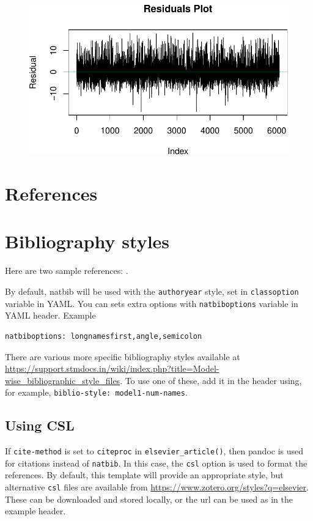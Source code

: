 \documentclass[
  super,
  preprint,
  3p]{elsarticle}
\begin{document}
\begin{figure}[H]

{\centering \includegraphics{project_report_files/figure-pdf/unnamed-chunk-17-1.pdf}

}

\end{figure}

\hypertarget{references}{%
\section*{References}\label{references}}

\hypertarget{bibliography-styles}{%
\section{Bibliography styles}\label{bibliography-styles}}

Here are two sample references: \citet{Feynman1963118}
\citet{Dirac1953888}.

By default, natbib will be used with the \texttt{authoryear} style, set
in \texttt{classoption} variable in YAML. You can sets extra options
with \texttt{natbiboptions} variable in YAML header. Example

\begin{verbatim}
natbiboptions: longnamesfirst,angle,semicolon
\end{verbatim}

There are various more specific bibliography styles available at
\url{https://support.stmdocs.in/wiki/index.php?title=Model-wise_bibliographic_style_files}.
To use one of these, add it in the header using, for example,
\texttt{biblio-style:\ model1-num-names}.

\hypertarget{using-csl}{%
\subsection{Using CSL}\label{using-csl}}

If \texttt{cite-method} is set to \texttt{citeproc} in
\texttt{elsevier\_article()}, then pandoc is used for citations instead
of \texttt{natbib}. In this case, the \texttt{csl} option is used to
format the references. By default, this template will provide an
appropriate style, but alternative \texttt{csl} files are available from
\url{https://www.zotero.org/styles?q=elsevier}. These can be downloaded
and stored locally, or the url can be used as in the example header.


  
\end{document}
